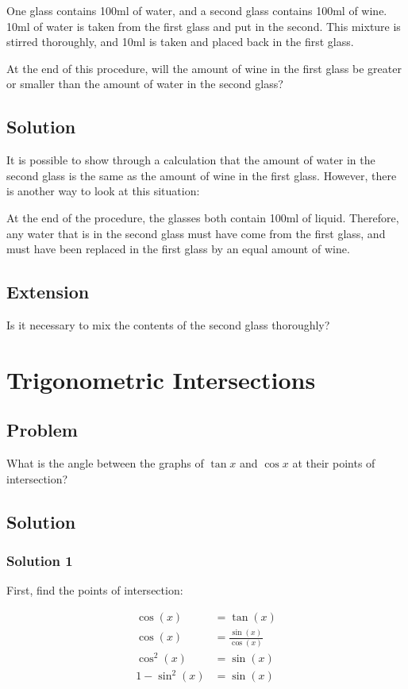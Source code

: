 \documentclass{book}
\begin{document}
One glass contains 100ml of water, and a second glass contains 100ml of wine. 10ml of water is taken from the first glass and put in the second. This mixture is stirred thoroughly, and 10ml is taken and placed back in the first glass.

At the end of this procedure, will the amount of wine in the first glass be greater or smaller than the amount of water in the second glass?

\subsection{Solution}
It is possible to show through a calculation that the amount of water in the second glass is the same as the amount of wine in the first glass. However, there is another way to look at this situation:

At the end of the procedure, the glasses both contain 100ml of liquid. Therefore, any water that is in the second glass must have come from the first glass, and must have been replaced in the first glass by an equal amount of wine.

\subsection{Extension}
Is it necessary to mix the contents of the second glass thoroughly?
\newpage
\section{Trigonometric Intersections}

\subsection{Problem}

What is the angle between the graphs of \(\tan x\) and \(\cos x\) at their points of intersection?
\subsection{Solution}
\subsubsection{Solution 1}
First, find the points of intersection:

\begin{align*}
\cos(x)&=\tan(x)\\
\cos(x)&=\frac{\sin(x)}{\cos(x)}\\
\cos^2(x)&=\sin(x)\\
1-\sin^2(x)&=\sin(x)
\end{align*}
\end{document}
